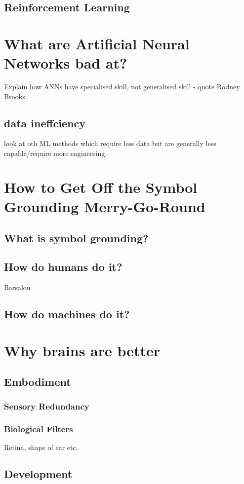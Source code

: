 \subsection{Reinforcement Learning}

\section{What are Artificial Neural Networks bad at?}
Explain how ANNs have specialised skill, not generalised skill - quote Rodney Brooks.
\subsection{data ineffciency}
look at oth ML methods which require less data but are generally less capable/require more engineering.


\section{How to Get Off the Symbol Grounding Merry-Go-Round} 
\subsection{What is symbol grounding?}
\subsection{How do humans do it?}
Barsalou

\subsection{How do machines do it?}

\section{Why brains are better}
\subsection{Embodiment}
\subsubsection{Sensory Redundancy}
\subsubsection{Biological Filters}
Retina, shape of ear etc.
\subsection{Development}
